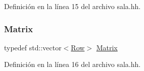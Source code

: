 Definición en la línea 15 del archivo sala.\+hh.

\mbox{\label{sala_8hh_a274a66ac4d9c777e113af0a65bb3912a}} 
\subsubsection{\texorpdfstring{Matrix}{Matrix}}
{\footnotesize\ttfamily typedef std\+::vector$<$\mbox{\hyperlink{sala_8hh_aa33775a3e721e5fbd17b48a94ed3ca94}{Row}}$>$ \mbox{\hyperlink{almacen_8hh_acdf2b2dca71b1d617c96d1afa6a525fa}{Matrix}}}



Definición en la línea 16 del archivo sala.\+hh.

